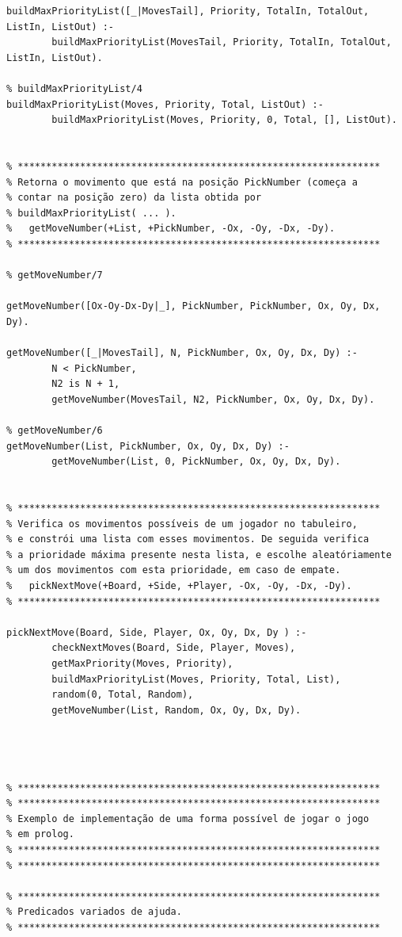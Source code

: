 \documentclass[15pt,a4paper]{article}
\begin{document}
\begin{lstlisting}
buildMaxPriorityList([_|MovesTail], Priority, TotalIn, TotalOut, ListIn, ListOut) :-
		buildMaxPriorityList(MovesTail, Priority, TotalIn, TotalOut, ListIn, ListOut).

% buildMaxPriorityList/4
buildMaxPriorityList(Moves, Priority, Total, ListOut) :-
		buildMaxPriorityList(Moves, Priority, 0, Total, [], ListOut).


% ****************************************************************
% Retorna o movimento que está na posição PickNumber (começa a
% contar na posição zero) da lista obtida por
% buildMaxPriorityList( ... ).
%	getMoveNumber(+List, +PickNumber, -Ox, -Oy, -Dx, -Dy).
% ****************************************************************

% getMoveNumber/7

getMoveNumber([Ox-Oy-Dx-Dy|_], PickNumber, PickNumber, Ox, Oy, Dx, Dy).

getMoveNumber([_|MovesTail], N, PickNumber, Ox, Oy, Dx, Dy) :-
		N < PickNumber,
		N2 is N + 1,
		getMoveNumber(MovesTail, N2, PickNumber, Ox, Oy, Dx, Dy).

% getMoveNumber/6
getMoveNumber(List, PickNumber, Ox, Oy, Dx, Dy) :-
		getMoveNumber(List, 0, PickNumber, Ox, Oy, Dx, Dy).


% ****************************************************************
% Verifica os movimentos possíveis de um jogador no tabuleiro,
% e constrói uma lista com esses movimentos. De seguida verifica
% a prioridade máxima presente nesta lista, e escolhe aleatóriamente
% um dos movimentos com esta prioridade, em caso de empate.
%	pickNextMove(+Board, +Side, +Player, -Ox, -Oy, -Dx, -Dy).
% ****************************************************************

pickNextMove(Board, Side, Player, Ox, Oy, Dx, Dy ) :-
		checkNextMoves(Board, Side, Player, Moves),
		getMaxPriority(Moves, Priority),
		buildMaxPriorityList(Moves, Priority, Total, List),
		random(0, Total, Random),
		getMoveNumber(List, Random, Ox, Oy, Dx, Dy).
		
		
		
		
% ****************************************************************
% ****************************************************************
% Exemplo de implementação de uma forma possível de jogar o jogo
% em prolog.
% ****************************************************************
% ****************************************************************

% ****************************************************************
% Predicados variados de ajuda.
% ****************************************************************


\end{lstlisting}
\end{document}
